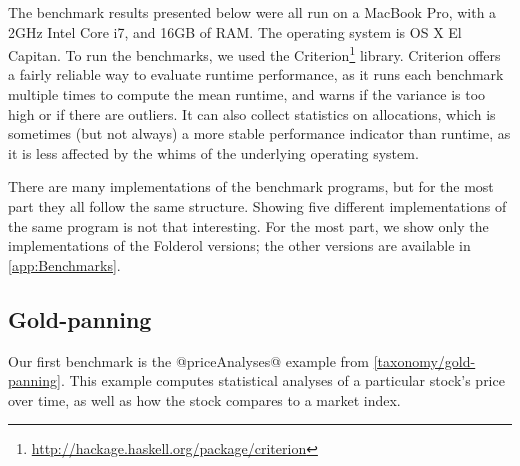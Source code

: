The benchmark results presented below were all run on a MacBook Pro, with a 2GHz Intel Core i7, and 16GB of RAM.
The operating system is OS X El Capitan.
To run the benchmarks, we used the Criterion\footnote{\url{http://hackage.haskell.org/package/criterion}} library.
Criterion offers a fairly reliable way to evaluate runtime performance, as it runs each benchmark multiple times to compute the mean runtime, and warns if the variance is too high or if there are outliers.
It can also collect statistics on allocations, which is sometimes (but not always) a more stable performance indicator than runtime, as it is less affected by the whims of the underlying operating system.

There are many implementations of the benchmark programs, but for the most part they all follow the same structure.
Showing five different implementations of the same program is not that interesting.
For the most part, we show only the implementations of the Folderol versions; the other versions are available in \cref{app:Benchmarks}.

\subsection{Gold-panning}

Our first benchmark is the @priceAnalyses@ example from \cref{taxonomy/gold-panning}.
This example computes statistical analyses of a particular stock's price over time, as well as how the stock compares to a market index.


